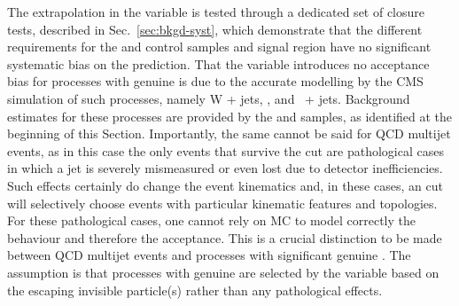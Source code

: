 The extrapolation in the variable \alphat is tested through a
dedicated set of closure tests, described in Sec.~\ref{sec:bkgd-syst},
which demonstrate that the different \alphat requirements for the \mj
and \mmj control samples and signal region have no significant
systematic bias on the prediction. That the \alphat variable
introduces no acceptance bias for processes with genuine \met is due
to the accurate modelling by the CMS simulation of such processes,
namely W + jets, \ttbar, and \znunu\ + jets. Background estimates for
these processes are provided by the \mj and \mmj samples, as
identified at the beginning of this Section. Importantly, the same
cannot be said for QCD multijet events, as in this case the only
events that survive the \alphat cut are pathological cases in which a
jet is severely mismeasured or even lost due to detector
inefficiencies. Such effects certainly do change the event kinematics
and, in these cases, an \alphat cut will selectively choose events
with particular kinematic features and topologies. For these
pathological cases, one cannot rely on MC to model correctly the
behaviour and therefore the \alphat acceptance. This is a crucial
distinction to be made between QCD multijet events and processes with
significant genuine \met. The assumption is that processes with
genuine \met are selected by the \alphat variable based on the
escaping invisible particle(s) rather than any pathological effects.

